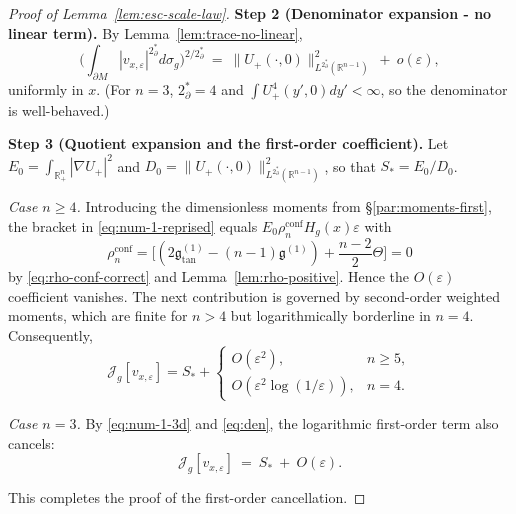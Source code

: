 \documentclass[11pt,reqno,a4paper]{amsart}
\newcommand{\R}{\mathbb{R}}
\numberwithin{equation}{section}
\theoremstyle{plain}
\theoremstyle{remark}
\theoremstyle{plain}
\begin{document}
\begin{proof}[Proof of Lemma~\ref{lem:esc-scale-law}]
\medskip
\noindent\textbf{Step 2 (Denominator expansion - no linear term).}
By Lemma~\ref{lem:trace-no-linear},
\begin{equation}\label{eq:den}
\Big(\int_{\partial M}|v_{x,\varepsilon}|^{2^*_{\partial}}d\sigma_g\Big)^{2/2^*_{\partial}}
\ =\ \|U_+(\cdot,0)\|_{L^{2^*_{\partial}}(\R^{n-1})}^{2}\ +\ o(\varepsilon),
\end{equation}
uniformly in $x$. (For $n=3$, $2^*_\partial=4$ and
$\int U_+^4(y',0)dy'<\infty$, so the denominator is well-behaved.)

\medskip
\noindent\textbf{Step 3 (Quotient expansion and the first-order coefficient).}
Let $E_0 = \int_{\R^n_+}|\nabla U_+|^2$ and $D_0 = \|U_+(\cdot,0)\|_{L^{2^*_{\partial}}(\R^{n-1})}^{2}$, so that $S_\ast=E_0/D_0$.

\emph{Case $n\ge4$.}
Introducing the dimensionless moments from \S\ref{par:moments-first}, the bracket in \eqref{eq:num-1-reprised}
equals $E_0\rho_n^{\mathrm{conf}}H_g(x)\varepsilon$ with
\[
\rho_n^{\mathrm{conf}}=\Bigg[
\left(2\mathfrak g^{(1)}_{\mathrm{tan}}-(n-1)\mathfrak g^{(1)}\right)
+ \frac{n-2}{2}\Theta\Bigg]
= 0
\]
by \eqref{eq:rho-conf-correct} and Lemma~\ref{lem:rho-positive}. Hence
the $O(\varepsilon)$ coefficient vanishes.  The next contribution is governed
by second-order weighted moments, which are finite for $n>4$ but
logarithmically borderline in $n=4$.  Consequently,
\begin{equation}\label{eq:Esc-expansion}
\mathcal J_g[v_{x,\varepsilon}]
= S_\ast+
\begin{cases}
O(\varepsilon^2), & n\ge5,\\[1mm]
O\!\left(\varepsilon^2\log(1/\varepsilon)\right), & n=4.
\end{cases}
\end{equation}

\emph{Case $n=3$.}
By \eqref{eq:num-1-3d} and \eqref{eq:den}, the logarithmic first-order term
also cancels:
\begin{equation}\label{eq:Esc-expansion-3d}
\mathcal J_g[v_{x,\varepsilon}]
\ =\ S_\ast\ +\ O(\varepsilon).
\end{equation}


This completes the proof of the first-order cancellation.
\end{proof}
\end{document}
